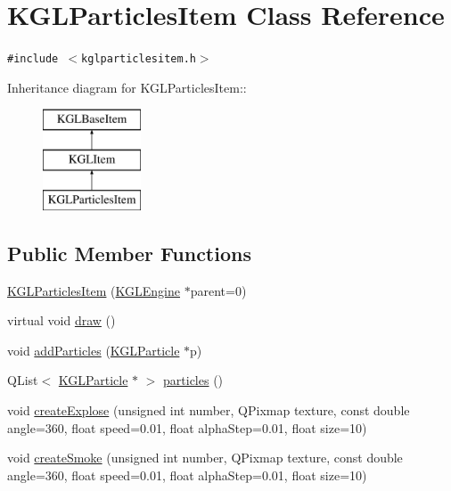 \hypertarget{class_k_g_l_particles_item}{
\section{KGLParticlesItem Class Reference}
\label{class_k_g_l_particles_item}
}
{\tt \#include $<$kglparticlesitem.h$>$}

Inheritance diagram for KGLParticlesItem::\begin{figure}[H]
\begin{center}
\leavevmode
\includegraphics[height=3cm]{class_k_g_l_particles_item}
\end{center}
\end{figure}
\subsection*{Public Member Functions}
\begin{CompactItemize}
\item 
\hyperlink{class_k_g_l_particles_item_f9d2aff0b3f2f6b8b2e188cf7c69b99d}{KGLParticlesItem} (\hyperlink{class_k_g_l_engine}{KGLEngine} $\ast$parent=0)
\item 
virtual void \hyperlink{class_k_g_l_particles_item_ce6df2f63f0566993f075f7ce55bb714}{draw} ()
\item 
void \hyperlink{class_k_g_l_particles_item_e9b4281df0cdce181e5c72674d3b62fd}{addParticles} (\hyperlink{class_k_g_l_particle}{KGLParticle} $\ast$p)
\item 
QList$<$ \hyperlink{class_k_g_l_particle}{KGLParticle} $\ast$ $>$ \hyperlink{class_k_g_l_particles_item_fd39ca4535f227749edc932acbfb23f9}{particles} ()
\item 
void \hyperlink{class_k_g_l_particles_item_0d5e698526a16718ee51d33ef6c3c28d}{createExplose} (unsigned int number, QPixmap texture, const double angle=360, float speed=0.01, float alphaStep=0.01, float size=10)
\item 
void \hyperlink{class_k_g_l_particles_item_55ff83e136b35f0caaeb0ef065623573}{createSmoke} (unsigned int number, QPixmap texture, const double angle=360, float speed=0.01, float alphaStep=0.01, float size=10)
\end{CompactItemize}


